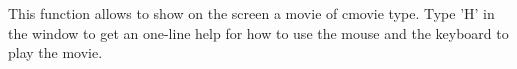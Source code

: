 This function allows to show on the screen a movie of cmovie type.
Type 'H' in the window to get an one-line help for how to use the mouse and
the keyboard to play the movie.
